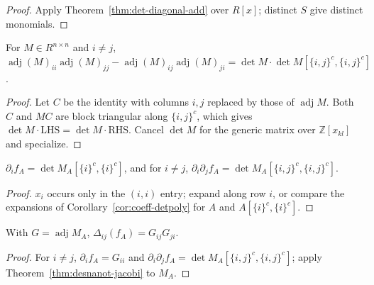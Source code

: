 \begin{proof}
\leanok
{}
Apply Theorem~\ref{thm:det-diagonal-add} over $R[x]$; distinct $S$ give distinct monomials.
\end{proof}

\begin{theorem}
\label{thm:desnanot-jacobi}
\leanok
For $M\in R^{n\times n}$ and $i\ne j$,
$\operatorname{adj}(M)_{ii}\operatorname{adj}(M)_{jj}-\operatorname{adj}(M)_{ij}\operatorname{adj}(M)_{ji}
=\det M\cdot\det M[\{i,j\}^c,\{i,j\}^c]$.
\end{theorem}

\begin{proof}
\leanok
Let $C$ be the identity with columns $i,j$ replaced by those of $\operatorname{adj}M$. Both $C$
and $MC$ are block triangular along $\{i,j\}^c$, which gives
$\det M\cdot\mathrm{LHS}=\det M\cdot\mathrm{RHS}$. Cancel $\det M$ for the generic matrix over
$\mathbb Z[x_{kl}]$ and specialize.
\end{proof}

\begin{lemma}[Derivatives of $f_A$]
\label{lem:pderiv-detpoly}
\leanok
{}
$\partial_i f_A=\det M_A[\{i\}^c,\{i\}^c]$, and for $i\ne j$,
$\partial_i\partial_j f_A=\det M_A[\{i,j\}^c,\{i,j\}^c]$.
\end{lemma}

\begin{proof}
$x_i$ occurs only in the $(i,i)$ entry; expand along row $i$, or compare the expansions of
Corollary~\ref{cor:coeff-detpoly} for $A$ and $A[\{i\}^c,\{i\}^c]$.
\end{proof}

\begin{theorem}
\label{thm:rayleigh-detpoly}
\leanok
{}
With $G=\operatorname{adj}M_A$, $\Delta_{ij}(f_A)=G_{ij}G_{ji}$.
\end{theorem}

\begin{proof}
For $i\ne j$, $\partial_if_A=G_{ii}$ and $\partial_i\partial_jf_A=\det M_A[\{i,j\}^c,\{i,j\}^c]$;
apply Theorem~\ref{thm:desnanot-jacobi} to $M_A$.
\end{proof}

